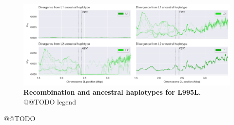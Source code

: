 \documentclass[a4paper,11pt,abstracton,hidelinks]{scrartcl}
\begin{document}
%
\begin{figure}[!b]
  \includegraphics[width=1.1\linewidth,center]{artwork/fig_recom_L.png}
  \caption{\textbf{Recombination and ancestral haplotypes for L995L}. @@TODO legend}
  \label{fig:recom_l}
\end{figure}


@@TODO


\printbibliography
\end{document}
